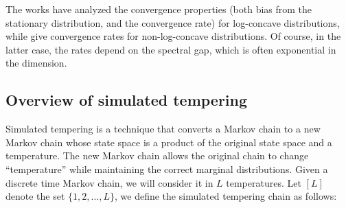 The works \cite{dalalyan2016theoretical, durmus2016high, dalalyan2017further} have analyzed the convergence properties (both bias from the stationary distribution, and the convergence rate) for log-concave distributions, while \cite{raginsky2017non} give convergence rates for non-log-concave distributions. Of course, in the latter case, the rates depend on the spectral gap, which is often exponential in the dimension. 




\subsection{Overview of simulated tempering}
\label{sec:overview-st}


Simulated tempering is a technique that converts a Markov chain to a new Markov chain whose state space is a product of the original state space and a temperature. The new Markov chain allows the original chain to change ``temperature'' while maintaining the correct marginal distributions. Given a discrete time Markov chain, we will consider it in $L$ temperatures. Let $[L]$ denote the set $\{1,2,...,L\}$, we define the simulated tempering chain as follows:

